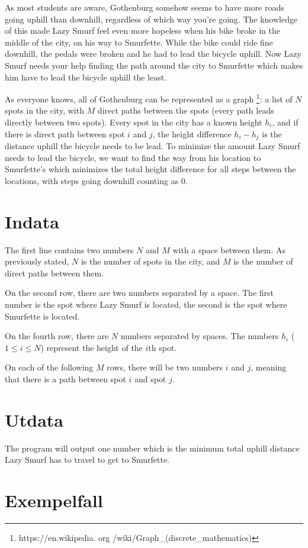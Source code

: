 
As most students are aware, Gothenburg somehow seems to have more roads going uphill than downhill,
regardless of which way you're going. The knowledge of this made Lazy Smurf feel even more hopeless
when his bike broke in the middle of the city, on his way to Smurfette. While the bike could ride
fine downhill, the pedals were broken and he had to lead the bicycle uphill. Now Lazy Smurf needs
your help finding the path around the city to Smurfette which makes him have to lead the bicycle
uphill the least.

As everyone knows, all of Gothenburg can be represented as a graph \footnote{https://en.wikipedia.
org /wiki/Graph_(discrete_mathematics)}: a list of $N$ spots in the city, with $M$ direct paths
between the spots (every path leads directly between two spots). Every spot in the city has a known
height $h_i$, and if there is direct path between spot $i$ and $j$, the height difference $h_i-h_j$
is the distance uphill the bicycle needs to be lead. To minimize the amount Lazy Smurf needs to lead
the bicycle, we want to find the way from his location to Smurfette's which minimizes the total
height difference for all steps between the locations, with steps going downhill counting as 0.

\section*{Indata}
The first line contains two numbers $N$ and $M$ with a space between them. As previously stated, $N$
is the number of spots in the city, and $M$ is the number of direct paths between them.

On the second row, there are two numbers separated by a space. The first number is the spot where
Lazy Smurf is located, the second is the spot where Smurfette is located.

On the fourth row, there are $N$ numbers separated by spaces. The numbers $h_i$ ($1 \le i \le N$)
represent the height of the $i$th spot.

On each of the following $M$ rows, there will be two numbers $i$ and $j$, meaning that there is a
path between spot $i$ and spot $j$.


\section*{Utdata}

The program will output one number which is the minimum total uphill distance Lazy Smurf has to
travel to get to Smurfette.

\section*{Exempelfall}
